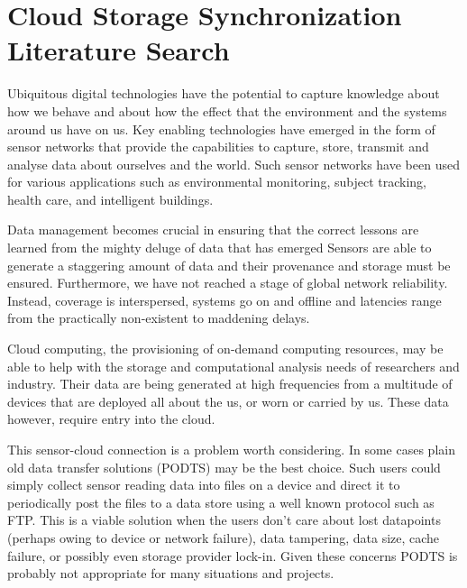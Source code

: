 \section{Cloud Storage Synchronization Literature Search}
Ubiquitous digital technologies have the potential to capture knowledge about how we behave and about how the effect that the environment and the systems around us have on us. Key enabling technologies have emerged in the form of sensor networks that provide the capabilities to capture, store, transmit and analyse data about ourselves and the world. Such sensor networks have been used for various applications such as environmental monitoring, subject tracking, health care, and intelligent buildings.

Data management becomes crucial in ensuring that the correct lessons are learned from the mighty deluge of data that has emerged Sensors are able to generate a staggering amount of data and their provenance and storage must be ensured. Furthermore, we have not reached a stage of global network reliability. Instead, coverage is interspersed, systems go on and offline and latencies range from the practically non-existent to maddening delays.

Cloud computing, the provisioning of on-demand computing resources, may be able to help with the storage and computational analysis needs of researchers and industry. Their data are being generated at high frequencies from a multitude of devices that are deployed all about the us, or worn or carried by us. These data however, require entry into the cloud. 

This sensor-cloud connection is a problem worth considering. In some cases plain old data transfer solutions (PODTS) may be the best choice. Such users could simply collect sensor reading data into files on a device and direct it to periodically post the files to a data store using a well known protocol such as FTP. This is a viable solution when the users don't care about lost datapoints (perhaps owing to device or network failure), data tampering, data size, cache failure, or possibly even storage provider lock-in. Given these concerns PODTS is probably not appropriate for many situations and projects.


